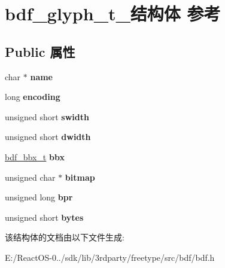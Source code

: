 \hypertarget{structbdf__glyph__t__}{}\section{bdf\+\_\+glyph\+\_\+t\+\_\+结构体 参考}
\label{structbdf__glyph__t__}
\subsection*{Public 属性}
\begin{DoxyCompactItemize}
\item 
\mbox{\label{structbdf__glyph__t___adcb5cc21da654f907c5ae5848159886c}} 
char $\ast$ {\bfseries name}
\item 
\mbox{\label{structbdf__glyph__t___a18b839b7b552ea0073e81e0e0c03f06a}} 
long {\bfseries encoding}
\item 
\mbox{\label{structbdf__glyph__t___a4df8445c7bd9d289e396bc7feaabade8}} 
unsigned short {\bfseries swidth}
\item 
\mbox{\label{structbdf__glyph__t___a4a514c0d62e761aa1c00ef24d7c1036c}} 
unsigned short {\bfseries dwidth}
\item 
\mbox{\label{structbdf__glyph__t___a4ffd35898d76ffa81bd776d4f66307f5}} 
\hyperlink{structbdf__bbx__t__}{bdf\+\_\+bbx\+\_\+t} {\bfseries bbx}
\item 
\mbox{\label{structbdf__glyph__t___a225f6f82a06b20666c49dd746c55d9fd}} 
unsigned char $\ast$ {\bfseries bitmap}
\item 
\mbox{\label{structbdf__glyph__t___ac1d372ce97949b585ad23fab6c1c4484}} 
unsigned long {\bfseries bpr}
\item 
\mbox{\label{structbdf__glyph__t___a67e54788cd17e66d237ee11685f12be4}} 
unsigned short {\bfseries bytes}
\end{DoxyCompactItemize}


该结构体的文档由以下文件生成\+:\begin{DoxyCompactItemize}
\item 
E\+:/\+React\+O\+S-\/0../sdk/lib/3rdparty/freetype/src/bdf/bdf.\+h\end{DoxyCompactItemize}
